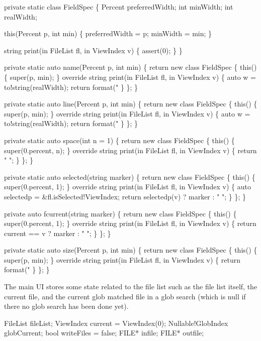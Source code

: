 \nwenddocs{}\endmoddef\nwstartdeflinemarkup\nwenddeflinemarkup
private static class FieldSpec
\{
  Percent preferredWidth;
  int     minWidth;
  int     realWidth;

  this(Percent p, int min) \{
    preferredWidth = p;
    minWidth = min;
  \}

  string print(in FileList fl, in ViewIndex v) \{
    assert(0);
  \}
\}

private static auto name(Percent p, int min)
\{
  return new class FieldSpec \{
    this() \{ super(p, min); \}
    override string print(in FileList fl, in ViewIndex v)
    \{
      auto w = to!string(realWidth);
      return format("%
    \}
  \};
\}

private static auto line(Percent p, int min)
\{
  return new class FieldSpec \{
    this() \{ super(p, min); \}
    override string print(in FileList fl, in ViewIndex v)
    \{
      auto w = to!string(realWidth);
      return format("%
    \}
  \};
\}

private static auto space(int n = 1)
\{
  return new class FieldSpec \{
    this() \{ super(0.percent, n); \}
    override string print(in FileList fl, in ViewIndex v)
    \{
      return " ";
    \}
  \};
\}

private static auto selected(string marker)
\{
  return new class FieldSpec \{
    this() \{ super(0.percent, 1); \}
    override string print(in FileList fl, in ViewIndex v)
    \{
      auto selectedp = &fl.isSelected!ViewIndex;
      return selectedp(v) ? marker : " ";
    \}
  \};
\}

private auto fcurrent(string marker)
\{
  return new class FieldSpec \{
    this() \{ super(0.percent, 1); \}
    override string print(in FileList fl, in ViewIndex v)
    \{
      return current == v ? marker : " ";
    \}
  \};
\}

private static auto size(Percent p, int min)
\{
  return new class FieldSpec \{
    this() \{ super(p, min); \}
    override string print(in FileList fl, in ViewIndex v)
    \{
      return format("%
    \}
  \};
\}

\nwendcode{}The main UI stores some state related to the file list such as the
file list itself, the current file, and the current glob matched file
in a glob search (which is null if there no glob search has been done
yet).

\nwenddocs{}\plusendmoddef\nwstartdeflinemarkup\nwenddeflinemarkup
FileList fileList;
ViewIndex current = ViewIndex(0);
Nullable!GlobIndex globCurrent;
bool writeFiles = false;
FILE* infile;
FILE* outfile;

